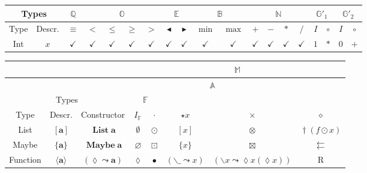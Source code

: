\documentclass{jsarticle}
\newcommand{\htypename}[1]{\mathbf{#1}}
\newcommand{\htypeclassname}[1]{\mathbb{#1}}
\newcommand{\heq}{\equiv}
\newcommand{\hsucc}{\blacktriangleright}
\newcommand{\hpred}{\blacktriangleleft}
\newcommand{\hmin}{\mathop{\text{min}}}
\newcommand{\hmax}{\mathop{\text{max}}}
\newcommand{\identity}{I}
\newcommand{\binaryop}{\circ}
\newcommand{\listtype}[1]{[#1]}
\newcommand{\maybetype}[1]{\{#1\}}
\newcommand{\functype}[1]{\langle#1\rangle}
\newcommand{\hrightarrow}{\leadsto}
\newcommand{\hlambdaparameter}{\lozenge}
\newcommand{\listtypeconst}[1]{\mathop{\htypename{List}}\htypename{#1}}
\newcommand{\maybetypeconst}[1]{\mathop{\htypename{Maybe}}\htypename{#1}}
\newcommand{\functypeconst}[1]{(\hlambdaparameter\hrightarrow\htypename{#1})}
\newcommand{\hfmap}{\cdot}
\newcommand{\hlistfmap}{\odot}
\newcommand{\hmaybefmap}{\boxdot}
\newcommand{\hfuncfmap}{\bullet}
\newcommand{\hemptylist}{\emptyset}
\newcommand{\hnothing}{\varnothing}
\newcommand{\hid}{\hlambdaparameter}
\newcommand{\hlambda}{\backslash}
\newcommand{\hlambdaparameterignore}{\_}
\newcommand{\hpure}{\star}
\newcommand{\hpurelist}[1]{\listtype{#1}}
\newcommand{\hpuremaybe}[1]{\maybetype{#1}}
\newcommand{\hpurefunc}[1]{(\hlambda\hlambdaparameterignore\hrightarrow#1)}
\newcommand{\hafmap}{\times}
\newcommand{\hlistafmap}{\otimes}
\newcommand{\hmaybeafmap}{\boxtimes}
\newcommand{\hfuncafmap}[1]{(\hlambda#1\hrightarrow\hlambdaparameter#1(\hlambdaparameter#1))}
\newcommand{\hmonadmap}{\diamond}
\newcommand{\hconcat}{\mathop{\dag}}
\begin{document}
\begin{center}
\begin{tabular}{||c|c||c||c|c|c|c||c|c||c|c||c|c|c|c||c|c||c|c||}
\hline
\multicolumn{2}{||c||}{Types}
    &\multicolumn{1}{|c||}{$\htypeclassname{Q}$}
    &\multicolumn{4}{|c||}{$\htypeclassname{O}$}
    &\multicolumn{2}{|c||}{$\htypeclassname{E}$}
    &\multicolumn{2}{|c||}{$\htypeclassname{B}$}
    &\multicolumn{4}{|c||}{$\htypeclassname{N}$}
    &\multicolumn{2}{|c||}{$\htypeclassname{G}'_1$}
    &\multicolumn{2}{|c||}{$\htypeclassname{G}'_2$}\\
\hline
Type
    &Descr.
    &$\heq$
    &$<$
    &$\le$
    &$\ge$
    &$>$
    &$\hpred$
    &$\hsucc$
    &$\hmin$
    &$\hmax$
    &$+$
    &$-$
    &$*$
    &$/$
    &$\identity$
    &$\binaryop$
    &$\identity$
    &$\binaryop$\\
\hline\hline
Int
    &$x$
    &$\checkmark$
    &$\checkmark$
    &$\checkmark$
    &$\checkmark$
    &$\checkmark$
    &$\checkmark$
    &$\checkmark$
    &$\checkmark$
    &$\checkmark$
    &$\checkmark$
    &$\checkmark$
    &$\checkmark$
    &$\checkmark$
    &$1$
    &$\ast$
    &$0$
    &$+$\\
\hline
\end{tabular}
\end{center}



\begin{center}
\begin{tabular}{||c|c|c||c|c|c|c|c||}
\hline
\multicolumn{3}{||c||}{ }
    &\multicolumn{5}{|c||}{$\htypeclassname{M}$}\\
\hline
\multicolumn{3}{||c||}{ }
    &\multicolumn{4}{|c|}{$\htypeclassname{A}$}
    &\multicolumn{1}{|c||}{ }\\
\hline
\multicolumn{3}{||c||}{Types}
    &\multicolumn{2}{|c|}{$\htypeclassname{F}$}
    &\multicolumn{2}{|c|}{ }
    & \\
\hline
Type
    &Descr.
    &Constructor
    &$\identity_\htypeclassname{F}$
    &$\hfmap$
    &$\hpure x$
    &$\hafmap$
    &$\hmonadmap$\\
\hline\hline
List
    &$\listtype{\htypename{a}}$
    &$\listtypeconst{a}$
    &$\hemptylist$
    &$\hlistfmap$
    &$\hpurelist{x}$
    &$\hlistafmap$
    &$\hconcat(f\hlistfmap x)$\\
\hline
Maybe
    &$\maybetype{\htypename{a}}$
    &$\maybetypeconst{a}$
    &$\hnothing$
    &$\hmaybefmap$
    &$\hpuremaybe{x}$
    &$\hmaybeafmap$
    &$\leftleftarrows$\\
\hline
Function
    &$\functype{\htypename{a}}$
    &$\functypeconst{a}$
    &$\hid$
    &$\hfuncfmap$
    &$\hpurefunc{x}$
    &$\hfuncafmap{x}$
    &R\\
\hline
\end{tabular}
\end{center}
\end{document}
